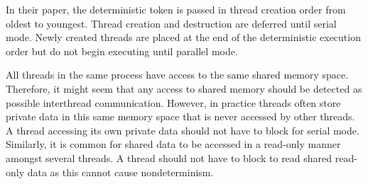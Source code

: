 In their paper, the deterministic token is passed in thread creation
order from oldest to youngest.  Thread creation and destruction are
deferred until serial mode.  Newly created threads are placed at the
end of the deterministic execution order but do not begin executing
until parallel mode.

All threads in the same process have access to the same shared memory
space.  Therefore, it might seem that any access to shared memory
should be detected as possible interthread communication.  However, in
practice threads often store private data in this same memory space
that is never accessed by other threads.  A thread accessing its own
private data should not have to block for serial mode.  Similarly, it
is common for shared data to be accessed in a read-only manner amongst
several threads.  A thread should not have to block to read shared
read-only data as this cannot cause nondeterminism.

